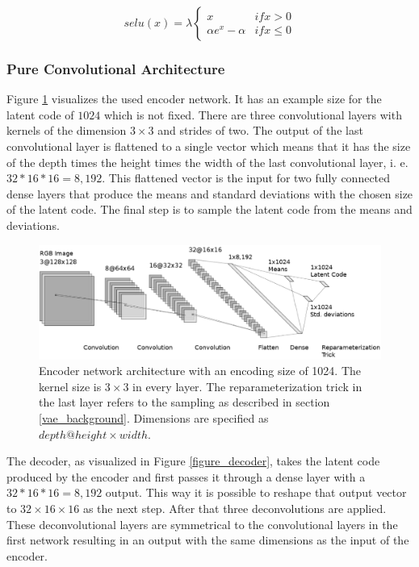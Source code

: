 \begin{equation}
    selu(x) = \lambda \begin{cases}
        x & if x > 0 \\
        \alpha e^x- \alpha & if x \leq 0
    \end{cases}
\end{equation}

\subsubsection{Pure Convolutional Architecture} \label{section_pure_convolutional_architecture}

Figure \ref{figure_pure_convolutional_encoder} visualizes the used encoder network. It has an example size for the
latent code of $1024$ which is not fixed. There are three convolutional
layers with kernels of the dimension $3\times 3$ and strides of two. The output of the last convolutional layer
is flattened to a single vector which means that it has the size of the depth times the height times the width of
the last convolutional layer, i. e. $32*16*16 = 8,192$. This flattened vector is the input for two fully connected
dense layers that produce the means and standard deviations with the chosen size of the latent code. The final step
is to sample the latent code from the means and deviations.

\begin{figure}[h]
    \centering
    \includegraphics[width=\textwidth]{images/figures/encoder_neural_network.png}
    \caption{Encoder network architecture with an encoding size of 1024.
    The kernel size is $3\times 3$ in every layer. The 
    reparameterization trick in the last layer
    refers to the sampling as described in section \ref{vae_background}.
    Dimensions are specified as $depth@height\times width$.} \label{figure_pure_convolutional_encoder}
\end{figure}

The decoder, as visualized in Figure \ref{figure_decoder}, takes the latent code produced by the encoder and 
first passes it through a dense layer with a $32*16*16=8,192$ output. This way it is possible to reshape that
output vector to $32\times 16\times 16$ as the next step. After that three deconvolutions are applied.
These deconvolutional layers are symmetrical to the convolutional layers in the first network resulting in an 
output with the same dimensions as the input of the encoder. 


